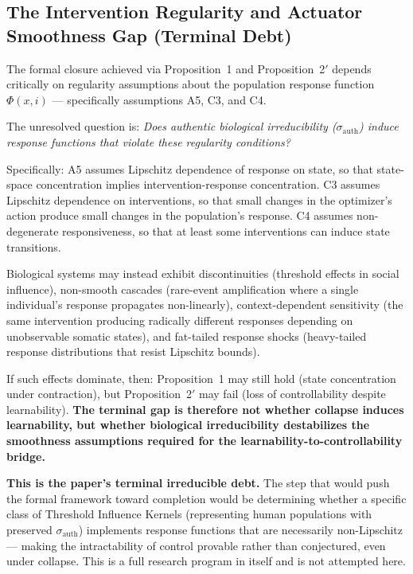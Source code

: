 \documentclass[11pt, a4paper]{article}
\theoremstyle{remark}
\begin{document}
\subsection{The Intervention Regularity and Actuator Smoothness Gap (Terminal Debt)}\label{sec:terminal-debt}

The formal closure achieved via Proposition~1 and Proposition~2$'$ depends critically on regularity assumptions about the population response function $\Phi(x, i)$ --- specifically assumptions A5, C3, and C4.

The unresolved question is: \emph{Does authentic biological irreducibility ($\sigma_{\text{auth}}$) induce response functions that violate these regularity conditions?}

Specifically: A5 assumes Lipschitz dependence of response on state, so that state-space concentration implies intervention-response concentration. C3 assumes Lipschitz dependence on interventions, so that small changes in the optimizer's action produce small changes in the population's response. C4 assumes non-degenerate responsiveness, so that at least some interventions can induce state transitions.

Biological systems may instead exhibit discontinuities (threshold effects in social influence), non-smooth cascades (rare-event amplification where a single individual's response propagates non-linearly), context-dependent sensitivity (the same intervention producing radically different responses depending on unobservable somatic states), and fat-tailed response shocks (heavy-tailed response distributions that resist Lipschitz bounds).

If such effects dominate, then: Proposition~1 may still hold (state concentration under contraction), but Proposition~2$'$ may fail (loss of controllability despite learnability). \textbf{The terminal gap is therefore not whether collapse induces learnability, but whether biological irreducibility destabilizes the smoothness assumptions required for the learnability-to-controllability bridge.}

\textbf{This is the paper's terminal irreducible debt.} The step that would push the formal framework toward completion would be determining whether a specific class of Threshold Influence Kernels (representing human populations with preserved $\sigma_{\text{auth}}$) implements response functions that are necessarily non-Lipschitz --- making the intractability of control provable rather than conjectured, even under collapse. This is a full research program in itself and is not attempted here.
\end{document}
